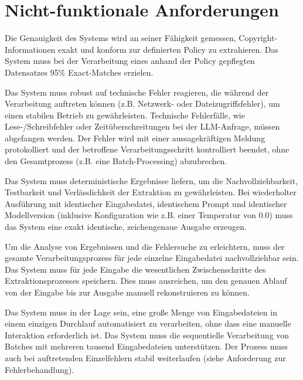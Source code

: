 \section{Nicht-funktionale Anforderungen}\label{sec:nicht-funktionale-anforderungen}

\begin{anforderungsliste}
        {Die Genauigkeit des Systems wird an seiner Fähigkeit gemessen, Copyright-Informationen exakt und konform zur definierten Policy zu extrahieren.}
        {Das System muss bei der Verarbeitung eines anhand der Policy gepflegten Datensatzes 95\% Exact-Matches erzielen.}

        {Das System muss robust auf technische Fehler reagieren, die während der Verarbeitung auftreten können (z.B. Netzwerk- oder Dateizugriffsfehler), um einen stabilen Betrieb zu gewährleisten.}
        {Technische Fehlerfälle, wie Lese-/Schreibfehler oder Zeitüberschreitungen bei der LLM-Anfrage, müssen abgefangen werden. Der Fehler wird mit einer aussagekräftigen Meldung protokolliert und der betroffene Verarbeitungsschritt kontrolliert beendet, ohne den Gesamtprozess (z.B. eine Batch-Processing) abzubrechen.}

        {Das System muss deterministische Ergebnisse liefern, um die Nachvollziehbarkeit, Testbarkeit und Verlässlichkeit der Extraktion zu gewährleisten.}
        {Bei wiederholter Ausführung mit identischer Eingabedatei, identischem Prompt und identischer Modellversion (inklusive Konfiguration wie z.B. einer Temperatur von 0.0) muss das System eine exakt identische, zeichengenaue Ausgabe erzeugen.}

        {Um die Analyse von Ergebnissen und die Fehlersuche zu erleichtern, muss der gesamte Verarbeitungsprozess für jede einzelne Eingabedatei nachvollziehbar sein.}
        {Das System muss für jede Eingabe die wesentlichen Zwischenschritte des Extraktionsprozesses speichern. Dies muss ausreichen, um den genauen Ablauf von der Eingabe bis zur Ausgabe manuell rekonstruieren zu können.}

        {Das System muss in der Lage sein, eine große Menge von Eingabedateien in einem einzigen Durchlauf automatisiert zu verarbeiten, ohne dass eine manuelle Interaktion erforderlich ist.}
        {Das System muss die sequentielle Verarbeitung von Batches mit mehreren tausend Eingabedateien unterstützen. Der Prozess muss auch bei auftretenden Einzelfehlern stabil weiterlaufen (siehe Anforderung zur Fehlerbehandlung).}


\end{anforderungsliste}
